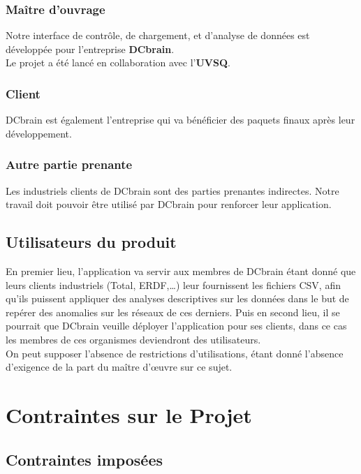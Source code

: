 			\subsubsection{Maître d'ouvrage}
			Notre interface de contrôle, de chargement, et d'analyse de données est développée pour l'entreprise \textbf{DCbrain}.\\
			Le projet a été lancé en collaboration avec l'\textbf{UVSQ}.
			
			\subsubsection{Client}
			DCbrain est également l'entreprise qui va bénéficier des paquets finaux après leur développement.
			
			\subsubsection{Autre partie prenante}
			Les industriels clients de DCbrain sont des parties prenantes indirectes. Notre travail doit pouvoir être utilisé par DCbrain pour renforcer leur application.
			
		\subsection{Utilisateurs du produit}
		En premier lieu, l’application va servir aux membres de DCbrain étant donné que leurs clients industriels (Total, ERDF,…) leur fournissent les fichiers CSV, afin qu’ils puissent appliquer des analyses descriptives sur les données dans le but de repérer des anomalies sur les réseaux de ces derniers. Puis en second lieu, il se pourrait que DCbrain veuille déployer l'application pour ses clients, dans ce cas les membres de ces organismes deviendront des utilisateurs.\\
		
		On peut supposer l'absence de restrictions d'utilisations, étant donné l'absence d'exigence de la part du maître d'œuvre sur ce sujet.

	\section{Contraintes sur le Projet}
		\subsection{Contraintes imposées}
